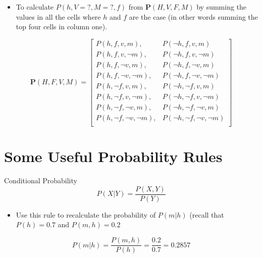 \documentclass[xcolor={table}]{beamer}
\begin{document}
\begin{frame}
	\begin{example}
	\begin{itemize}
	\item To calculate $P(h,V=?,M=?,f)$ from $\mathbf{P}(H,V,F,M)$ by summing the values in all the cells where $h$ and $f$ are the case (in other words summing the top four cells in column one).
\end{itemize}
\begin{equation*}
\mathbf{P}(H,F,V,M) = \left[ \begin{array}{ll} 
P(h, f, v, m),& P(\lnot h, f, v, m)\\
P(h, f, v, \lnot m),& P(\lnot h, f, v, \lnot m)\\
P(h, f, \lnot v, m),& P(\lnot h, f, \lnot v, m)\\
P(h, f, \lnot v, \lnot m),& P(\lnot h, f, \lnot v, \lnot m)\\
P(h, \lnot f, v, m),& P(\lnot h, \lnot f, v, m)\\
P(h, \lnot f, v, \lnot m),& P(\lnot h, \lnot f, v, \lnot m)\\
P(h, \lnot f, \lnot v, m),& P(\lnot h, \lnot f, \lnot v, m) \\
P(h, \lnot f, \lnot v, \lnot m),& P(\lnot h, \lnot f, \lnot v, \lnot m) \\ \end{array} \right]
\label{eq:jointprobABC}
\end{equation*}
\end{example}
\end{frame}

\section{Some Useful Probability Rules}

 \begin{frame} 
\begin{alertblock}{Conditional Probability}
\begin{equation}
P(X|Y) = \frac{P(X,Y)}{P(Y)}
\label{eq:condProbBasic}
\end{equation}
\end{alertblock}
\begin{itemize}
	\item Use this rule to recalculate the probability of $P(m|h)$ (recall that $P(h)=0.7$ and $P(m,h)=0.2$ 
\end{itemize}
\pause
\begin{example}
\begin{equation*}
P(m|h)=\frac{P(m,h)}{P(h)} = \frac{0.2}{0.7}=0.2857
\end{equation*}
\end{example}
\end{frame} 
\end{document}
